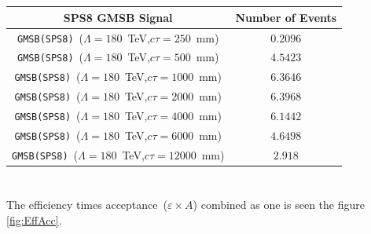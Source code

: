  \paragraph*{}\mbox{}\\
\begin{minipage}{\linewidth} 
\begin{center}
\begin{tabular}{c c}
\toprule
\hline
\bfseries{SPS8 GMSB Signal} & \bfseries {Number of Events}\\
\hline
\toprule
\texttt{GMSB(SPS8)}~($\Lambda=180$~TeV,$c\tau=250$~mm) & $0.2096$ \\
\texttt{GMSB(SPS8)}~($\Lambda=180$~TeV,$c\tau=500$~mm) & $4.5423$  \\
\texttt{GMSB(SPS8)}~($\Lambda=180$~TeV,$c\tau=1000$~mm) & $6.3646$ \\
\texttt{GMSB(SPS8)}~($\Lambda=180$~TeV,$c\tau=2000$~mm) & $6.3968$ \\ 
\texttt{GMSB(SPS8)}~($\Lambda=180$~TeV,$c\tau=4000$~mm) & $6.1442$ \\
\texttt{GMSB(SPS8)}~($\Lambda=180$~TeV,$c\tau=6000$~mm) & $4.6498$ \\
\texttt{GMSB(SPS8)}~($\Lambda=180$~TeV,$c\tau=12000$~mm) & $2.918$ \\
\hline 
\bottomrule
\end{tabular}
\label{tab:SIGNALRES}
\end{center}
\end{minipage}
\paragraph*{}\mbox{}\\
The efficiency times acceptance~($\varepsilon \times A$) combined as one is seen the figure \ref{fig:EffAcc}.

